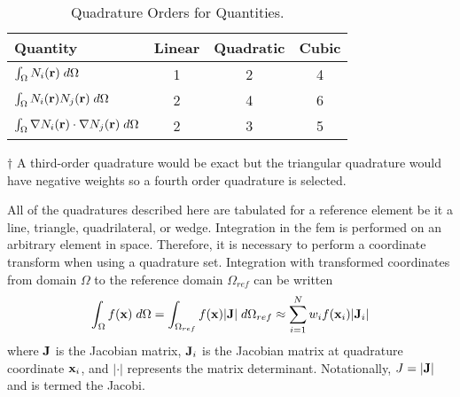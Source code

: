    \begin{table}
      \begin{center}
        \caption{Quadrature Orders for  Quantities.}
        \label{tab:quadrature_orders}
        \begin{threeparttable}
          \begin{tabular}{lccc}
            \toprule
            Quantity & Linear & Quadratic & Cubic \\
            \midrule
            $\int_{\Omega} N_i(\mathbf{r}) \;d\Omega$ & 1 & 2 & 4
              \tnote{$\dagger$} \\
            $\int_{\Omega} N_i(\mathbf{r}) N_j(\mathbf{r}) \;d\Omega$ &
              2 & 4 & 6 \\
            $\int_{\Omega} \mathbf{\nabla} N_i(\mathbf{r}) \cdot \mathbf{\nabla} N_j(\mathbf{r}) 
              \;d\Omega$ & 2 & 3 & 5 \\
            \bottomrule
          \end{tabular}
          \begin{tablenotes}
            \item[$\dagger$] A third-order quadrature would be exact but the 
              triangular quadrature would have negative weights so a fourth 
              order quadrature is selected.
          \end{tablenotes}
        \end{threeparttable}
      \end{center}
    \end{table}
    
    All of the quadratures described here are tabulated for a reference element
    be it a line, triangle, quadrilateral, or wedge. Integration in the 
    \gls{fem} is performed on an arbitrary element in space. Therefore, it is 
    necessary to perform a coordinate transform when using a quadrature set.
    Integration with transformed coordinates from domain $\Omega$ to the
    reference domain $\Omega_{ref}$ can be written
    \begin{equation}
      \int_{\Omega} f(\mathbf{x}) \;d\Omega = 
        \int_{\Omega_{ref}} f(\mathbf{x}) \lvert \mathbf{J} \rvert \;d\Omega_{ref} \approx
        \sum_{i=1}^{N} w_i f(\mathbf{x}_i) \lvert \mathbf{J}_i \rvert
    \end{equation}
    where $\mathbf{J}$ is the Jacobian matrix, $\mathbf{J}_i$ is the Jacobian matrix at 
    quadrature coordinate $\mathbf{x}_i$, and $\lvert \cdot \rvert$ represents
    the matrix determinant. Notationally, $J=\lvert \mathbf{J} \rvert$ and is termed
    the Jacobi.

